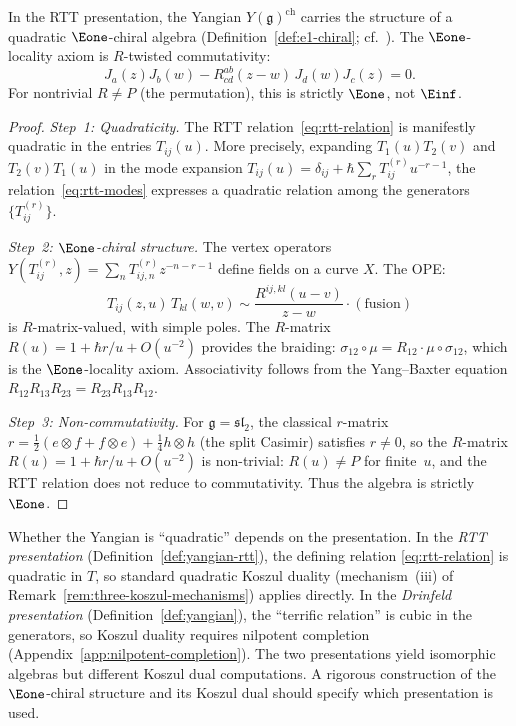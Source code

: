 \begin{theorem}\label{thm:yangian-e1}
In the RTT presentation, the Yangian $Y(\mathfrak{g})^{\mathrm{ch}}$ carries the structure of a quadratic $\Eone$-chiral algebra (Definition~\ref{def:e1-chiral}; cf.\ \cite[§4.1]{HA}).  The $\Eone$-locality axiom is $R$-twisted commutativity:
\begin{equation}\label{eq:r-twisted-locality}
J_a(z) J_b(w) - R^{ab}_{cd}(z-w)\, J_d(w) J_c(z) = 0.
\end{equation}
For nontrivial $R \neq P$ (the permutation), this is strictly $\Eone$,
not $\Einf$.
\end{theorem}

\begin{proof}
\emph{Step~1: Quadraticity.}  The RTT relation~\eqref{eq:rtt-relation} is manifestly quadratic in the entries $T_{ij}(u)$.  More precisely, expanding $T_1(u) T_2(v)$ and $T_2(v) T_1(u)$ in the mode expansion $T_{ij}(u) = \delta_{ij} + \hbar \sum_r T_{ij}^{(r)} u^{-r-1}$, the relation~\eqref{eq:rtt-modes} expresses a quadratic relation among the generators $\{T_{ij}^{(r)}\}$.

\emph{Step~2: $\Eone$-chiral structure.}
The vertex operators $Y(T_{ij}^{(r)}, z) = \sum_n T_{ij,n}^{(r)} z^{-n-r-1}$ define fields on a curve $X$.  The OPE:
\[
T_{ij}(z,u)\, T_{kl}(w,v) \sim \frac{R^{ij,kl}(u-v)}{z-w} \cdot (\text{fusion})
\]
is $R$-matrix-valued, with simple poles.  The $R$-matrix $R(u) = 1 + \hbar r/u + O(u^{-2})$ provides the braiding: $\sigma_{12} \circ \mu = R_{12} \cdot \mu \circ \sigma_{12}$, which is the $\Eone$-locality axiom.  Associativity follows from the Yang--Baxter equation $R_{12}R_{13}R_{23} = R_{23}R_{13}R_{12}$.

\emph{Step~3: Non-commutativity.}
For $\mathfrak{g} = \mathfrak{sl}_2$, the classical $r$-matrix $r = \frac{1}{2}(e \otimes f + f \otimes e) + \frac{1}{4} h \otimes h$ (the split Casimir) satisfies $r \neq 0$, so the $R$-matrix $R(u) = 1 + \hbar r/u + O(u^{-2})$ is non-trivial: $R(u) \neq P$ for finite~$u$, and the RTT relation does not reduce to commutativity.  Thus the algebra is strictly $\Eone$.
\end{proof}

\begin{remark}\label{rem:yangian-presentations}
Whether the Yangian is ``quadratic'' depends on the presentation.  In the \emph{RTT presentation} (Definition~\ref{def:yangian-rtt}), the defining relation \eqref{eq:rtt-relation} is quadratic in $T$, so standard quadratic Koszul duality (mechanism~(iii) of Remark~\ref{rem:three-koszul-mechanisms}) applies directly.  In the \emph{Drinfeld presentation} (Definition~\ref{def:yangian}), the ``terrific relation'' is cubic in the generators, so Koszul duality requires nilpotent completion (Appendix~\ref{app:nilpotent-completion}).
The two presentations yield isomorphic algebras but different Koszul dual
computations.  A rigorous construction of the $\Eone$-chiral structure and its
Koszul dual should specify which presentation is used.
\end{remark}

